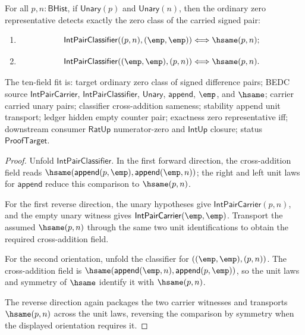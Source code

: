 \begin{theorem}
\label{thm:int-pair-classifier-zero-representative-criterion}
For all $p,n:\mathsf{BHist}$, if $\mathsf{Unary}(p)$ and
$\mathsf{Unary}(n)$, then the ordinary zero representative detects exactly the
zero class of the carried signed pair:
\begin{enumerate}
\item
$$
\mathsf{IntPairClassifier}((p,n),(\emp,\emp))
\Longleftrightarrow
\hsame(p,n);
$$
\item
$$
\mathsf{IntPairClassifier}((\emp,\emp),(p,n))
\Longleftrightarrow
\hsame(p,n).
$$
\end{enumerate}
The ten-field fit is: target ordinary zero class of signed difference pairs;
BEDC source $\mathsf{IntPairCarrier}$, $\mathsf{IntPairClassifier}$,
$\mathsf{Unary}$, $\mathsf{append}$, $\emp$, and $\hsame$; carrier carried
unary pairs; classifier cross-addition sameness; stability append unit
transport; ledger hidden empty counter pair; exactness zero representative iff;
downstream consumer $\mathsf{RatUp}$ numerator-zero and $\mathsf{IntUp}$
closure; status
$\mathsf{ProofTarget}$.
\end{theorem}
\begin{proof}
Unfold $\mathsf{IntPairClassifier}$. In the first forward direction, the
cross-addition field reads
$\hsame(\mathsf{append}(p,\emp),\mathsf{append}(\emp,n))$; the right and left
unit laws for $\mathsf{append}$ reduce this comparison to $\hsame(p,n)$.

For the first reverse direction, the unary hypotheses give
$\mathsf{IntPairCarrier}(p,n)$, and the empty unary witness gives
$\mathsf{IntPairCarrier}(\emp,\emp)$. Transport the assumed $\hsame(p,n)$
through the same two unit identifications to obtain the required
cross-addition field.

For the second orientation, unfold the classifier for
$((\emp,\emp),(p,n))$. The cross-addition field is
$\hsame(\mathsf{append}(\emp,n),\mathsf{append}(p,\emp))$, so the unit laws and
symmetry of $\hsame$ identify it with $\hsame(p,n)$.

The reverse direction again packages the two carrier witnesses and transports
$\hsame(p,n)$ across the unit laws, reversing the comparison by symmetry when
the displayed orientation requires it.
\end{proof}

